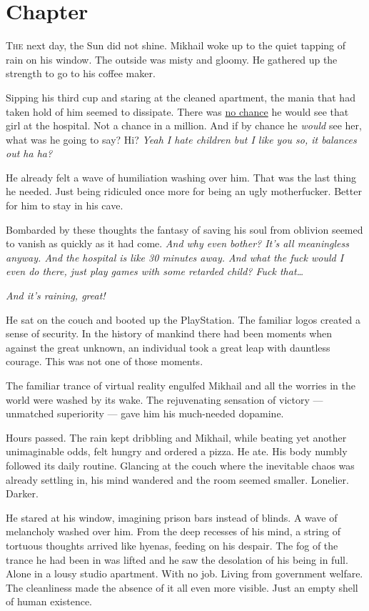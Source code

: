\chapter{Chapter \thechapter}

\lettrine[lraise=0.1, nindent=0.1em, slope=-.5em]{T}{he} next day, the Sun did not shine. Mikhail woke up to the quiet tapping of rain on his window. The outside was misty and gloomy. He gathered up the strength to go to his coffee maker.

Sipping his third cup and staring at the cleaned apartment, the mania that had taken hold of him seemed to dissipate. There was \underline{no chance} he would see that girl at the hospital. Not a chance in a million. And if by chance he \textit{would} see her, what was he going to say? Hi? \textit{Yeah I hate children but I like you so, it balances out ha ha?}

He already felt a wave of humiliation washing over him. That was the last thing he needed. Just being ridiculed once more for being an ugly motherfucker. Better for him to stay in his cave.

Bombarded by these thoughts the fantasy of saving his soul from oblivion seemed to vanish as quickly as it had come. \textit{And why even bother? It’s all meaningless anyway. And the hospital is like 30 minutes away. And what the fuck would I even do there, just play games with some retarded child? Fuck that…}

\textit{And it’s raining, great!}

He sat on the couch and booted up the PlayStation. The familiar logos created a sense of security. In the history of mankind there had been moments when against the great unknown, an individual took a great leap with dauntless courage. This was not one of those moments.

The familiar trance of virtual reality engulfed Mikhail and all the worries in the world were washed by its wake. The rejuvenating sensation of victory — unmatched superiority — gave him his much-needed dopamine.

Hours passed. The rain kept dribbling and Mikhail, while beating yet another unimaginable odds, felt hungry and ordered a pizza. He ate. His body numbly followed its daily routine. Glancing at the couch where the inevitable chaos was already settling in, his mind wandered and the room seemed smaller. Lonelier. Darker.

He stared at his window, imagining prison bars instead of blinds. A wave of melancholy washed over him. From the deep recesses of his mind, a string of tortuous thoughts arrived like hyenas, feeding on his despair. The fog of the trance he had been in was lifted and he saw the desolation of his being in full. Alone in a lousy studio apartment. With no job. Living from government welfare. The cleanliness made the absence of it all even more visible. Just an empty shell of human existence.

